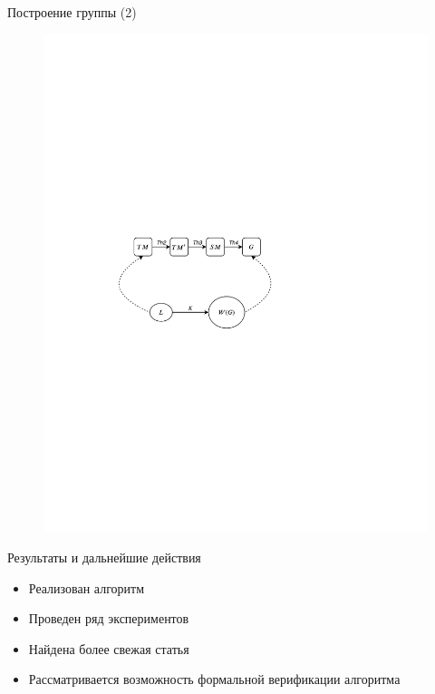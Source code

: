 \documentclass[xcolor=table]{beamer}
\begin{document}
\begin{frame}[fragile]{Построение группы (2)}
\begin{figure}[H]
  \centering
  \includegraphics[width=120mm]{pictures/2.pdf}
 \end{figure}
\end{frame}

\begin{frame}[fragile]{Результаты и дальнейшие действия}
    \begin{itemize}
        \item Реализован алгоритм
        \item Проведен ряд экспериментов
        \item Найдена более свежая статья
        \item Рассматривается возможность формальной верификации алгоритма
    \end{itemize}
\end{frame}
\end{document}

